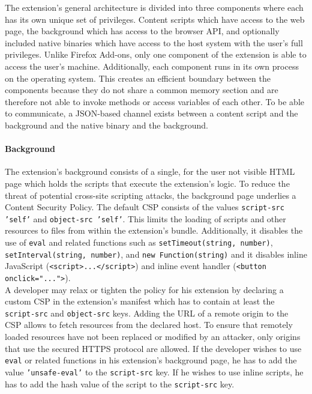{	The extension's general architecture is divided into three components where each has its own unique set of privileges. Content scripts which have access to the web page, the background which has access to the browser API, and optionally included native binaries which have access to the host system with the user's full privileges. Unlike Firefox Add-ons, only one component of the extension is able to access the user's machine. Additionally, each component runs in its own process on the operating system. This creates an efficient boundary between the components because they do not share a common memory section and are therefore not able to invoke methods or access variables of each other. To be able to communicate, a JSON-based channel exists between a content script and the background and the native binary and the background. 
		
\paragraph{Background}
	
	The extension's background consists of a single, for the user not visible HTML page which holds the scripts that execute the extension's logic. To reduce the threat of potential cross-site scripting attacks, the background page underlies a Content Security Policy. The default CSP consists of the values \texttt{script-src 'self'} and \texttt{object-src 'self'}. This limits the loading of scripts and other resources to files from within the extension's bundle. Additionally, it disables the use of \texttt{eval} and related functions such as \texttt{setTimeout(string, number)}, \texttt{setInterval(string, number)}, and \texttt{new Function(string)} and it disables inline JavaScript (\texttt{<script>...</script>}) and inline event handler (\texttt{<button onclick="...">}). \\
	A developer may relax or tighten the policy for his extension by declaring a custom CSP in the extension's manifest which has to contain at least the \texttt{script-src} and \texttt{object-src} keys. Adding the URL of a remote origin to the CSP allows to fetch resources from the declared host. To ensure that remotely loaded resources have not been replaced or modified by an attacker, only origins that use the secured HTTPS protocol are allowed. If the developer wishes to use \texttt{eval} or related functions in his extension's background page, he has to add the value \texttt{'unsafe-eval'} to the \texttt{script-src} key. If he wishes to use inline scripts, he has to add the hash value of the script to the \texttt{script-src} key.
	
}

